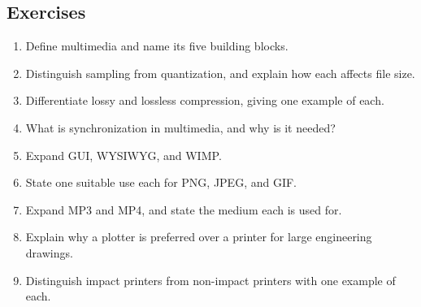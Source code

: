 \subsection*{Exercises}
\begin{enumerate}[label=\arabic*.]
  \item Define multimedia and name its five building blocks.
  \item Distinguish sampling from quantization, and explain how each affects
    file size.
  \item Differentiate lossy and lossless compression, giving one example of
    each.
  \item What is synchronization in multimedia, and why is it needed?
  \item Expand GUI, WYSIWYG, and WIMP.
  \item State one suitable use each for PNG, JPEG, and GIF.
  \item Expand MP3 and MP4, and state the medium each is used for.
  \item Explain why a plotter is preferred over a printer for large engineering
    drawings.
  \item Distinguish impact printers from non-impact printers with one example
    of each.
\end{enumerate}

